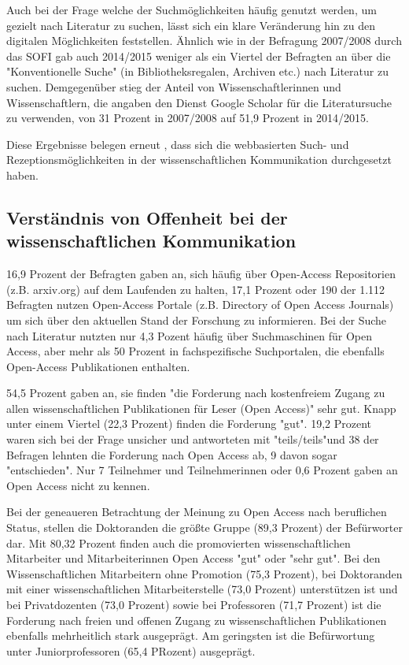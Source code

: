Auch bei der Frage welche der Suchmöglichkeiten häufig genutzt werden, um gezielt nach Literatur zu suchen, lässt sich ein klare Veränderung hin zu den digitalen Möglichkeiten feststellen. Ähnlich wie in der Befragung 2007/2008 durch das SOFI gab auch 2014/2015 weniger als ein Viertel der Befragten an über die "Konventionelle Suche" (in Bibliotheksregalen, Archiven etc.) nach Literatur zu suchen. Demgegenüber stieg der Anteil von Wissenschaftlerinnen und Wissenschaftlern, die angaben den Dienst Google Scholar für die Literatursuche zu verwenden, von 31 Prozent in 2007/2008 auf 51,9 Prozent in 2014/2015.

Diese Ergebnisse belegen erneut \cite{Hanekop_2014}, dass sich die webbasierten Such- und Rezeptionsmöglichkeiten in der wissenschaftlichen Kommunikation durchgesetzt haben.

\subsection{Verständnis von Offenheit bei der wissenschaftlichen Kommunikation}

16,9 Prozent der Befragten gaben an, sich häufig über Open-Access Repositorien (z.B. arxiv.org) auf dem Laufenden zu halten, 17,1 Prozent oder 190 der 1.112 Befragten nutzen Open-Access Portale (z.B. Directory of Open Access Journals) um sich über den aktuellen Stand der Forschung zu informieren. Bei der Suche nach Literatur nutzten nur 4,3 Pozent häufig über Suchmaschinen für Open Access, aber mehr als 50 Prozent in fachspezifische Suchportalen, die ebenfalls Open-Access Publikationen enthalten.

54,5 Prozent gaben an, sie finden "die Forderung nach kostenfreiem Zugang zu allen wissenschaftlichen Publikationen für Leser (Open Access)" sehr gut. Knapp unter einem Viertel (22,3 Prozent) finden die Forderung "gut". 19,2 Prozent waren sich bei der Frage unsicher und antworteten mit "teils/teils"und 38 der Befragen lehnten die Forderung nach Open Access ab, 9 davon sogar "entschieden". Nur 7 Teilnehmer und Teilnehmerinnen oder 0,6 Prozent gaben an Open Access nicht zu kennen.

Bei der geneaueren Betrachtung der Meinung zu Open Access nach beruflichen Status, stellen die Doktoranden die größte Gruppe (89,3 Prozent) der Befürworter dar. Mit 80,32 Prozent finden auch die promovierten wissenschaftlichen Mitarbeiter und Mitarbeiterinnen Open Access "gut" oder "sehr gut". Bei den Wissenschaftlichen Mitarbeitern ohne Promotion (75,3 Prozent), bei Doktoranden mit einer wissenschaftlichen Mitarbeiterstelle (73,0 Prozent) unterstützen ist und bei Privatdozenten (73,0 Prozent) sowie bei Professoren (71,7 Prozent) ist die Forderung nach freien und offenen Zugang zu wissenschaftlichen Publikationen ebenfalls mehrheitlich stark ausgeprägt.  Am geringsten ist die Befürwortung unter Juniorprofessoren (65,4 PRozent) ausgeprägt.


